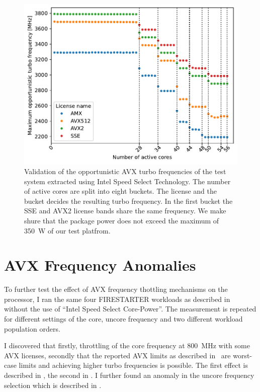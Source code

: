 \begin{figure}[]
    \centering
    \includegraphics[width=0.8\columnwidth]{fig/validate-avx-frequency-license-bands.pdf}
    \caption{\label{fig:validated-p0n-frequencies}Validation of the opportunistic AVX turbo frequencies of the test system extracted using Intel Speed Select Technology.
    The number of active cores are split into eight buckets. The license and the bucket decides the resulting turbo frequency.
    In the first bucket the SSE and AVX2 license bands share the same frequency. We make shure that the package power does not exceed the maximum of \SI{350}{\watt} of our test platfrom.}
\end{figure}


\section{AVX Frequency Anomalies}
\label{sec:avx-anomalies}

To further test the effect of AVX frequency thottling mechanisms on the processor, I ran the same four FIRESTARTER workloads as described in~ without the use of ``Intel Speed Select Core-Power''.
The measurement is repeated for different settings of the core, uncore frequency and two different workload population orders.

I discovered that firstly, throttling of the core frequency at \SI{800}{\MHz} with some AVX licenses, secondly that the reported AVX limits as described in~ are worst-case limits and achieving higher turbo frequencies is possible.
The first effect is described in , the second in .
I further found an anomaly in the uncore frequency selection which is described in .

